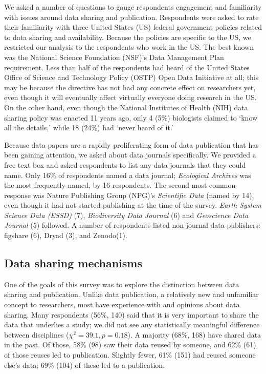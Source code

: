 \documentclass[10pt]{article}
\begin{document}
We asked a number of questions to gauge respondents engagement and familiarity with issues around data sharing and publication.
Respondents were asked to rate their familiarity with three United States (US) federal government policies related to data sharing and availability.
Because the policies are specific to the US, we restricted our analysis to the respondents who work in the US.
The best known was the National Science Foundation (NSF)'s Data Management Plan requirement\cite{national_science_foundation_gpg_2011}.
Less than half of the respondents had heard of the United States Office of Science and Technology Policy (OSTP) Open Data Initiative\cite{obama_making_2013} at all; this may be because the directive has not had any concrete effect on researchers yet, even though it will eventually affect virtually everyone doing research in the US.
On the other hand, even though the National Institutes of Health (NIH) data sharing policy\cite{national_institutes_of_health_final_2003} was enacted 11 years ago, only 4 (5\%) biologists claimed to `know all the details,' while 18 (24\%) had `never heard of it.'

Because data papers are a rapidly proliferating form of data publication that has been gaining attention, we asked about data journals specifically.
We provided a free text box and asked respondents to list any data journals that they could name.
Only 16\% of respondents named a data journal; \emph{Ecological Archives} was the most frequently named, by 16 respondents. 
The second most common response was Nature Publishing Group (NPG)'s \emph{Scientific Data} (named by 14), even though it had not started publishing at the time of the survey.
\emph{Earth System Science Data (ESSD)} (7), \emph{Biodiversity Data Journal} (6) and \emph{Geoscience Data Journal} (5) followed.
A number of respondents listed non-journal data publishers: figshare (6), Dryad (3), and Zenodo(1).

\subsection*{Data sharing mechanisms}

One of the goals of this survey was to explore the distinction between data sharing and publication.
Unlike data publication, a relatively new and unfamiliar concept to researchers, most have experience with and opinions about data sharing.
Many respondents (56\%, 140) said that it is very important to share the data that underlies a study; we did not see any statistically meaningful difference between disciplines ($\chi^{2}= 39.1, p= 0.18$). %
A majority (68\%, 168) have shared data in the past.
Of those, 58\% (98) saw their data reused by someone, and 62\% (61) of those reuses led to publication.
Slightly fewer, 61\% (151) had reused someone else's data; 69\% (104) of these led to a publication.
\end{document}
